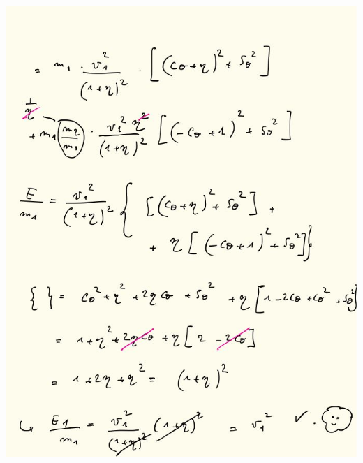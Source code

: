\documentclass[fleqn]{article}
\begin{document}
\begin{center}
  \includegraphics[height=18.5cm, width=18cm]{10.JPG}
\end{center}

\pagebreak
\end{document}
